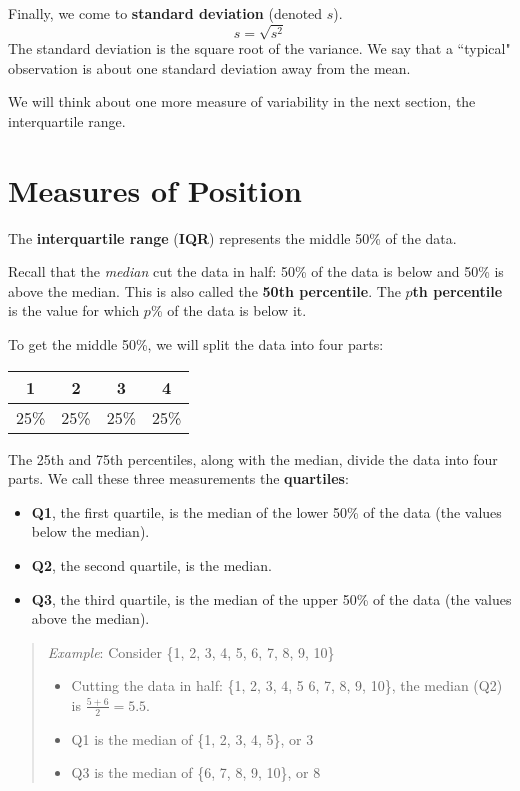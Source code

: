 \documentclass[
]{book}
\providecommand{\tightlist}{%
  \setlength{\itemsep}{0pt}\setlength{\parskip}{0pt}}
\begin{document}
Finally, we come to \textbf{standard deviation} (denoted \(s\)). \[s = \sqrt{s^2}\] The standard deviation is the square root of the variance. We say that a ``typical" observation is about one standard deviation away from the mean.

We will think about one more measure of variability in the next section, the interquartile range.

\hypertarget{measures-of-position}{%
\section{Measures of Position}\label{measures-of-position}}

The \textbf{interquartile range} (\textbf{IQR}) represents the middle 50\% of the data.

Recall that the \emph{median} cut the data in half: 50\% of the data is below and 50\% is above the median. This is also called the \textbf{50th percentile}. The \textbf{\(p\)th percentile} is the value for which \(p\)\% of the data is below it.

To get the middle 50\%, we will split the data into four parts:

\begin{longtable}[]{@{}cccc@{}}
\toprule
1 & 2 & 3 & 4 \\
\midrule
\endhead
25\% & 25\% & 25\% & 25\% \\
\bottomrule
\end{longtable}

The 25th and 75th percentiles, along with the median, divide the data into four parts. We call these three measurements the \textbf{quartiles}:

\begin{itemize}
\tightlist
\item
  \textbf{Q1}, the first quartile, is the median of the lower 50\% of the data (the values below the median).
\item
  \textbf{Q2}, the second quartile, is the median.
\item
  \textbf{Q3}, the third quartile, is the median of the upper 50\% of the data (the values above the median).
\end{itemize}

\begin{quote}
\emph{Example}: Consider \{1, 2, 3, 4, 5, 6, 7, 8, 9, 10\}

\begin{itemize}
\tightlist
\item
  Cutting the data in half: \{1, 2, 3, 4, 5 \textbar{} 6, 7, 8, 9, 10\}, the median (Q2) is \(\frac{5+6}{2}=5.5\).
\item
  Q1 is the median of \{1, 2, 3, 4, 5\}, or 3
\item
  Q3 is the median of \{6, 7, 8, 9, 10\}, or 8
\end{itemize}
\end{quote}
\end{document}
